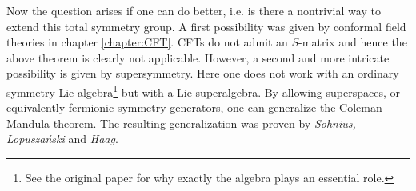     Now the question arises if one can do better, i.e. is there a nontrivial way to extend this total symmetry group. A first possibility was given by conformal field theories in chapter \ref{chapter:CFT}. CFTs do not admit an $S$-matrix and hence the above theorem is clearly not applicable. However, a second and more intricate possibility is given by supersymmetry. Here one does not work with an ordinary symmetry Lie algebra\footnote{See the original paper \cite{coleman_mandula} for why exactly the algebra plays an essential role.} but with a Lie superalgebra. By allowing superspaces, or equivalently fermionic symmetry generators, one can generalize the Coleman-Mandula theorem. The resulting generalization was proven by \textit{Sohnius, Lopusza\'nski} and \textit{Haag}.